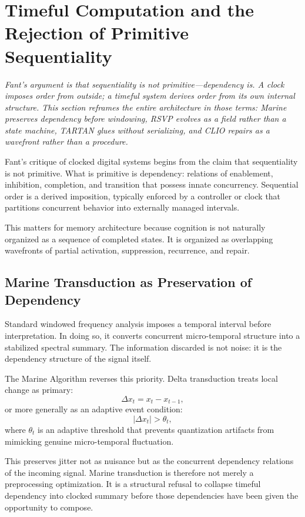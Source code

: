 \documentclass[12pt,a4paper]{article}
\begin{document}
\section{Timeful Computation and the Rejection of Primitive Sequentiality}
\label{sec:timeful}

\textit{Fant's argument is that sequentiality is not primitive---dependency is. A clock imposes order from outside; a timeful system derives order from its own internal structure. This section reframes the entire architecture in those terms: Marine preserves dependency before windowing, RSVP evolves as a field rather than a state machine, TARTAN glues without serializing, and CLIO repairs as a wavefront rather than a procedure.}

Fant's critique of clocked digital systems begins from the claim that sequentiality is not primitive. What is primitive is dependency: relations of enablement, inhibition, completion, and transition that possess innate concurrency. Sequential order is a derived imposition, typically enforced by a controller or clock that partitions concurrent behavior into externally managed intervals.

This matters for memory architecture because cognition is not naturally organized as a sequence of completed states. It is organized as overlapping wavefronts of partial activation, suppression, recurrence, and repair.

\subsection{Marine Transduction as Preservation of Dependency}

Standard windowed frequency analysis imposes a temporal interval before interpretation. In doing so, it converts concurrent micro-temporal structure into a stabilized spectral summary. The information discarded is not noise: it is the dependency structure of the signal itself.

The Marine Algorithm reverses this priority. Delta transduction treats local change as primary:
\[
\Delta x_t = x_t - x_{t-1},
\]
or more generally as an adaptive event condition:
\[
|\Delta x_t| > \theta_t,
\]
where $\theta_t$ is an adaptive threshold that prevents quantization artifacts from mimicking genuine micro-temporal fluctuation.

This preserves jitter not as nuisance but as the concurrent dependency relations of the incoming signal. Marine transduction is therefore not merely a preprocessing optimization. It is a structural refusal to collapse timeful dependency into clocked summary before those dependencies have been given the opportunity to compose.
\end{document}
